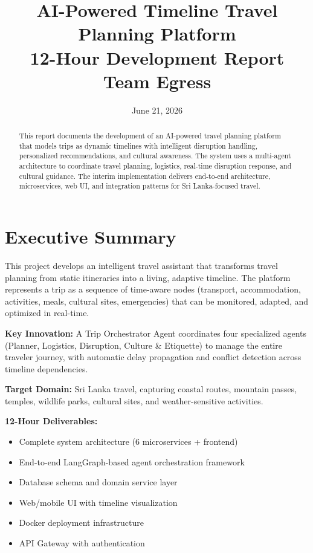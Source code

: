 \documentclass[11pt]{article}
\title{{\Large\bfseries AI-Powered Timeline Travel Planning Platform}\\
{\normalsize 12-Hour Development Report}\\
{\small Team Egress}}
\author{}
\date{June 21, 2026}
\begin{document}
\maketitle

\begin{abstract}
This report documents the development of an AI-powered travel planning platform that models trips as dynamic timelines with intelligent disruption handling, personalized recommendations, and cultural awareness. The system uses a multi-agent architecture to coordinate travel planning, logistics, real-time disruption response, and cultural guidance. The interim implementation delivers end-to-end architecture, microservices, web UI, and integration patterns for Sri Lanka-focused travel.
\end{abstract}

\tableofcontents
\newpage

\section{Executive Summary}

This project develops an intelligent travel assistant that transforms travel planning from static itineraries into a living, adaptive timeline. The platform represents a trip as a sequence of time-aware nodes (transport, accommodation, activities, meals, cultural sites, emergencies) that can be monitored, adapted, and optimized in real-time.

\textbf{Key Innovation:} A Trip Orchestrator Agent coordinates four specialized agents (Planner, Logistics, Disruption, Culture \& Etiquette) to manage the entire traveler journey, with automatic delay propagation and conflict detection across timeline dependencies.

\textbf{Target Domain:} Sri Lanka travel, capturing coastal routes, mountain passes, temples, wildlife parks, cultural sites, and weather-sensitive activities.

\textbf{12-Hour Deliverables:}
\begin{itemize}
    \item Complete system architecture (6 microservices + frontend)
    \item End-to-end LangGraph-based agent orchestration framework
    \item Database schema and domain service layer
    \item Web/mobile UI with timeline visualization
    \item Docker deployment infrastructure
    \item API Gateway with authentication
\end{itemize}
\end{document}
